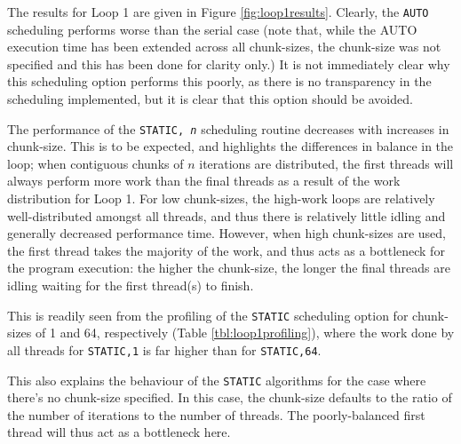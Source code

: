 \documentclass{article} %
\newcommand{\tp}{\texttt}
\begin{document}
The results for Loop 1 are given in Figure \ref{fig:loop1results}. Clearly, the \tp{AUTO} scheduling performs worse than the serial case (note that, while the AUTO execution time has been extended across all chunk-sizes, the chunk-size was not specified and this has been done for clarity only.)
It is not immediately clear why this scheduling option performs this poorly, as there is no transparency in the scheduling implemented, but it is clear that this option should be avoided.

The performance of the \tp{STATIC, \textit{n}} scheduling routine decreases with increases in chunk-size.
This is to be expected, and highlights the differences in balance in the loop; when contiguous chunks of $n$ iterations are distributed, the first threads will always perform more work than the final threads as a result of the work distribution for Loop 1.
For low chunk-sizes, the high-work loops are relatively well-distributed amongst all threads, and thus there is relatively little idling and generally decreased performance time.
However, when high chunk-sizes are used, the first thread takes the majority of the work, and thus acts as a bottleneck for the program execution: the higher the chunk-size, the longer the final threads are idling waiting for the first thread(s) to finish.

This is readily seen from the profiling of the \tp{STATIC} scheduling option for chunk-sizes of 1 and 64, respectively (Table \ref{tbl:loop1profiling}), where the work done by all threads for \tp{STATIC,1} is far higher than for \tp{STATIC,64}.

This also explains the behaviour of the \tp{STATIC} algorithms for the case where there's no chunk-size specified.
In this case, the chunk-size defaults to the ratio of the number of iterations to the number of threads.
The poorly-balanced first thread will thus act as a bottleneck here.
\end{document}
